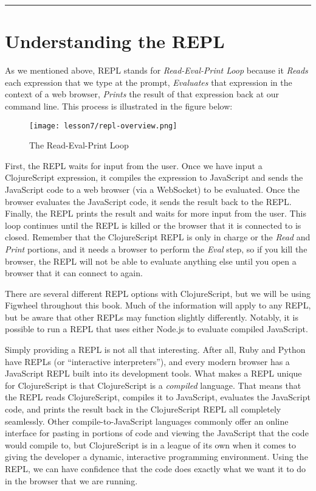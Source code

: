 \documentclass[10pt,twoside,openright]{memoir}
\begin{document}
\begin{center}\rule{0.5\linewidth}{0.5pt}\end{center}


\section{Understanding the REPL}

As we mentioned above, REPL stands for \emph{Read-Eval-Print Loop}
because it \emph{Reads} each expression that we type at the prompt,
\emph{Evaluates} that expression in the context of a web browser,
\emph{Prints} the result of that expression back at our command line.
This process is illustrated in the figure below:

\begin{figure}[H]
\caption{The Read-Eval-Print Loop}
\centering
\texttt{[image: lesson7/repl-overview.png]}
\end{figure}

First, the REPL waits for input from the user. Once we have input a
ClojureScript expression, it compiles the expression to JavaScript and
sends the JavaScript code to a web browser (via a WebSocket) to be
evaluated. Once the browser evaluates the JavaScript code, it sends the
result back to the REPL. Finally, the REPL prints the result and waits
for more input from the user. This loop continues until the REPL is
killed or the browser that it is connected to is closed. Remember that
the ClojureScript REPL is only in charge or the \emph{Read} and
\emph{Print} portions, and it needs a browser to perform the \emph{Eval}
step, so if you kill the browser, the REPL will not be able to evaluate
anything else until you open a browser that it can connect to again.

\clearpage

\begin{notice}[title={Note}]
There are several different REPL options with ClojureScript, but we will
be using Figwheel throughout this book. Much of the information will
apply to any REPL, but be aware that other REPLs may function slightly
differently. Notably, it is possible to run a REPL that uses either
Node.js to evaluate compiled JavaScript.
\end{notice}

Simply providing a REPL is not all that interesting. After all, Ruby and
Python have REPLs (or ``interactive interpreters''), and every modern
browser has a JavaScript REPL built into its development tools. What
makes a REPL unique for ClojureScript is that ClojureScript is a
\emph{compiled} language. That means that the REPL reads ClojureScript,
compiles it to JavaScript, evaluates the JavaScript code, and prints the
result back in the ClojureScript REPL all completely seamlessly. Other
compile-to-JavaScript languages commonly offer an online interface for
pasting in portions of code and viewing the JavaScript that the code
would compile to, but ClojureScript is in a league of its own when it
comes to giving the developer a dynamic, interactive programming
environment. Using the REPL, we can have confidence that the code does
exactly what we want it to do in the browser that we are running.
\end{document}
